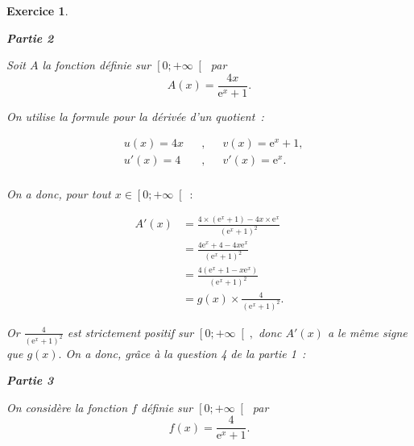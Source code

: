 \documentclass[10pt]{article}
\newtheorem{exo}{Exercice}
\begin{document}
\begin{exo}
\begin{enumerate}
\begin{multicols}{2}
\end{multicols}
\end{enumerate}

\medskip
 
\textbf{Partie 2}

\medskip
 
Soit $A$ la fonction définie sur $\left[0;+\infty\right[$ par \[A(x) = \frac{4x}{\text{e}^x + 1}.\]

\medskip

\setlength{\columnseprule}{1pt}

\begin{multicols}{2}

On utilise la formule pour la dérivée d'un quotient~:

\begin{align*}
&u(x)=4x&&,&& v(x)=\text{e}^x + 1, \\
& u'(x)=4&&, &&v'(x)=\text{e}^{x}.\\
\end{align*}

On a donc, pour tout $x\in \left[0;+\infty\right[~:$

\begin{align*}
A'(x)&=\frac{4\times \left(\text{e}^x + 1\right)-4x\times \text{e}^x }{\left(\text{e}^x + 1\right)^2}
\\&=\frac{4\text{e}^x+4-4x\text{e}^x}{\left(\text{e}^x + 1\right)^2}
\\&=\frac{4\left(\text{e}^x+1-x\text{e}^x\right)}{\left(\text{e}^x + 1\right)^2}
\\&=g(x)\times\frac{4}{\left(\text{e}^x + 1\right)^2}.
\end{align*}

Or $\frac{4 }{\left(\text{e}^x + 1\right)^2}$ est strictement positif sur $\left[0;+\infty\right[,$ donc $A'(x)$ a le même signe que $g(x).$ On a donc, grâce à la question 4 de la partie 1~:

\medskip
\begin{center}
\end{center}
\end{multicols}

\newpage
 
\textbf{Partie 3}

\medskip
 
On considère la fonction $f$ définie sur $\left[0;+\infty\right[$ par \[f(x) = \frac{4}{\text{e}^x + 1}.\]



\end{exo}
\end{document}
